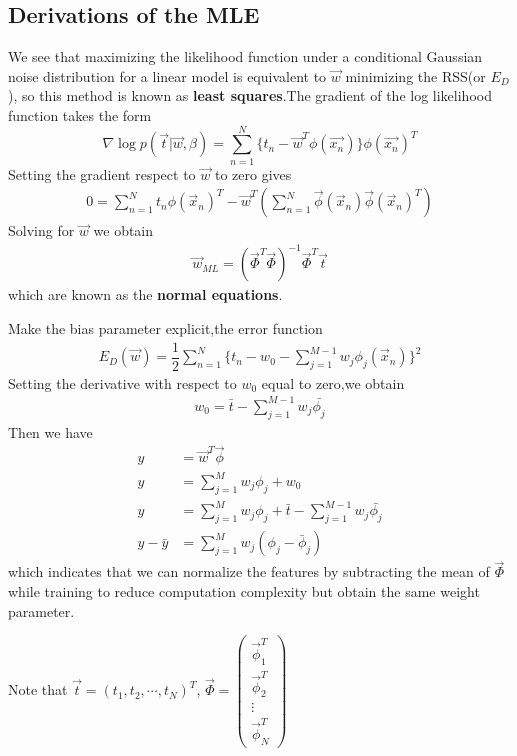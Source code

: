 \subsection{Derivations of the MLE}
We see that maximizing the likelihood function under a conditional Gaussian noise distribution for a linear model is equivalent to $\vec{w}$ minimizing the RSS(or $E_D$), so this method is known as \textbf{least squares}.The gradient of the log likelihood function takes the form
\begin{equation}
\nabla\log p(\vec{t}|\vec{w},\beta)
=\sum_{n=1}^{N}\{t_n-\vec{w}^T\phi(\vec{x_n}) \}\phi(\vec{x_n})^T
\end{equation}
Setting the gradient respect to $\vec{w}$ to zero gives
\begin{align}
0=\sum_{n=1}^{N}t_n\phi(\vec{x}_n)^T-\vec{w}^T(\sum_{n=1}^{N}\vec{\phi}(\vec{x}_n)\vec{\phi}(\vec{x}_n)^T)
\end{align}
Solving for $\vec{w}$ we obtain
\begin{align}
\vec{w}_{ML}=(\vec{\Phi}^T\vec{\Phi})^{-1}\vec{\Phi}^T\vec{t}
\end{align} 
which are known as the \textbf{normal equations}.

Make the bias parameter explicit,the error function
\begin{align}
E_D(\vec{w})=\dfrac{1}{2}\sum_{n=1}^{N}\{t_n-w_0-\sum_{j=1}^{M-1}w_j\phi_j(\vec{x}_n)\}^2
\end{align}
Setting the derivative with respect to $w_0$ equal to zero,we obtain
\begin{align}
w_0 = \bar{t}-\sum_{j=1}^{M-1}w_j\bar{\phi_j}
\end{align}
Then we have
\begin{align}
y&=\vec{w}^T\vec{\phi} \\
y&=\sum_{j=1}^{M}w_j \phi_j+w_0 \\
y&=\sum_{j=1}^{M}w_j \phi_j+\bar{t}-\sum_{j=1}^{M-1}w_j\bar{\phi_j} \\
y-\bar{y}&=\sum_{j=1}^{M}w_j(\phi_j-\bar{\phi}_j)
\end{align}
which indicates that we can normalize the features by subtracting the mean of $\vec{\Phi}$ while training to reduce computation complexity but obtain the same weight parameter.





Note that $\vec{t}=(t_1,t_2,\cdots,t_N)^T$, $\vec{\Phi}=\left(\begin{array}{c}\vec{\phi}_1^T \\ \vec{\phi}_2^T \\ \vdots \\ \vec{\phi}_N^T\end{array}\right)$
 
